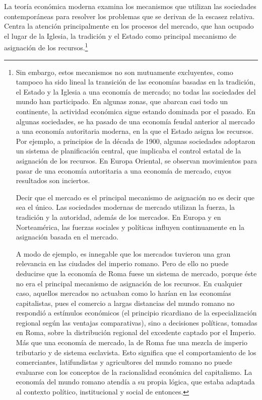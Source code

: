 \documentclass[10pt,a4paper]{article}
\begin{document}
La teoría económica moderna examina los mecanismos que utilizan las sociedades contemporáneas para resolver los problemas que se derivan de la escasez relativa. Centra la atención principalmente en los procesos del mercado, que han ocupado el lugar de la Iglesia, la tradición y el Estado como principal mecanismo de asignación de los recursos.\footnote{%
    Sin embargo, estos mecanismos no son mutuamente excluyentes, como tampoco ha sido lineal la transición de las economías basadas en la tradición, el Estado y la Iglesia a una economía de mercado; no todas las sociedades del mundo han participado. En algunas zonas, que abarcan casi todo un continente, la actividad económica sigue estando dominada por el pasado. En algunas sociedades, se ha pasado de una economía feudal anterior al mercado a una economía autoritaria moderna, en la que el Estado asigna los recursos. Por ejemplo, a principios de la década de 1900, algunas sociedades adoptaron un sistema de planificación central, que implicaba el control estatal de la asignación de los recursos. En Europa Oriental, se observan movimientos para pasar de una economía autoritaria a una economía de mercado, cuyos resultados son inciertos.

Decir que el mercado es el principal mecanismo de asignación no es decir que sea el único. Las sociedades modernas de mercado utilizan la fuerza, la tradición y la autoridad, además de los mercados. En Europa y en Norteamérica, las fuerzas sociales y políticas influyen continuamente en la asignación basada en el mercado.

A modo de ejemplo, es innegable que los mercados tuvieron una gran relevancia en las ciudades del imperio romano. Pero de ello no puede deducirse que la economía de Roma fuese un sistema de mercado, porque éste no era el principal mecanismo de asignación de los recursos. En cualquier caso, aquellos mercados no actuaban como lo harían en las economías capitalistas, pues el comercio a largas distancias del mundo romano no respondió a estímulos económicos (el principio ricardiano de la especialización regional según las ventajas comparativas), sino a decisiones políticas, tomadas en Roma, sobre la distribución regional del excedente captado por el Imperio. Más que una economía de mercado, la de Roma fue una mezcla de imperio tributario y de sistema esclavista. Esto significa que el comportamiento de los comerciantes, latifundistas y agricultores del mundo romano no puede evaluarse con los conceptos de la racionalidad económica del capitalismo. La economía del mundo romano atendía a su propia lógica, que estaba adaptada al contexto político, institucional y social de entonces.

}
\end{document}
